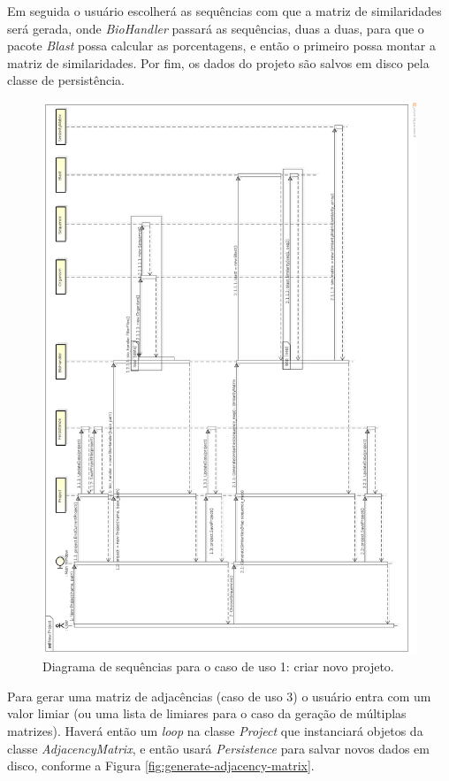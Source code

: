 Em seguida o usuário escolherá as sequências com que a matriz de similaridades será gerada, onde \textit{BioHandler} passará as sequências, duas a duas,
para que o pacote \textit{Blast} possa calcular as porcentagens, e então o primeiro possa montar a matriz de similaridades. Por fim, os dados do projeto
são salvos em disco pela classe de persistência.

\begin{figure}
\centering
\includegraphics[scale=0.27]{new-project}
\caption{Diagrama de sequências para o caso de uso 1: criar novo projeto.}
\label{fig:new-project}
\end{figure}

Para gerar uma matriz de adjacências (caso de uso 3)
o usuário entra com um valor limiar (ou uma lista de limiares para o caso da geração de múltiplas matrizes). Haverá
então um \textit{loop} na classe \textit{Project} que instanciará objetos da classe \textit{AdjacencyMatrix}, e então usará \textit{Persistence} para salvar
novos dados em disco, conforme a Figura \ref{fig:generate-adjacency-matrix}.

